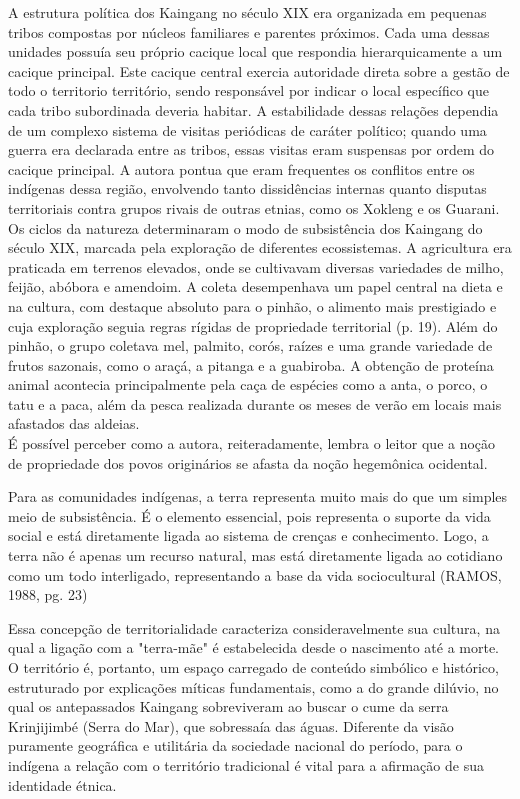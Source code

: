 \documentclass[12pt, a4paper]{article}
\newenvironment{citacao}{
  \vspace{0.5cm} %
  \small %
  \begin{list}{}{
    \leftmargin=4cm %
    \rightmargin=0cm
    \parsep=0pt
    \topsep=0pt
    \partopsep=0pt
  }
  \item\relax
  \linespread{1.0}\selectfont %
}{
  \end{list}
  \vspace{0.5cm} %
}
\begin{document}
A estrutura política dos Kaingang no século XIX era organizada em pequenas tribos compostas por núcleos familiares e parentes próximos. Cada uma dessas unidades possuía seu próprio cacique local que respondia hierarquicamente a um cacique principal. Este cacique central exercia autoridade direta sobre a gestão de todo o territorio território, sendo responsável por indicar o local específico que cada tribo subordinada deveria habitar. A estabilidade dessas relações dependia de um complexo sistema de visitas periódicas de caráter político; quando uma guerra era declarada entre as tribos, essas visitas eram suspensas por ordem do cacique principal. A autora pontua que eram frequentes os conflitos entre os indígenas dessa região, envolvendo tanto dissidências internas quanto disputas territoriais contra grupos rivais de outras etnias, como os Xokleng e os Guarani.
\\

Os ciclos da natureza determinaram o modo de subsistência dos Kaingang do século XIX, marcada pela exploração de diferentes ecossistemas. A agricultura era praticada em terrenos elevados, onde se cultivavam diversas variedades de milho, feijão, abóbora e amendoim. A coleta desempenhava um papel central na dieta e na cultura, com destaque absoluto para o pinhão, o alimento mais prestigiado e cuja exploração seguia regras rígidas de propriedade territorial (p. 19). Além do pinhão, o grupo coletava mel, palmito, corós, raízes e uma grande variedade de frutos sazonais, como o araçá, a pitanga e a guabiroba. A obtenção de proteína animal acontecia principalmente pela caça de espécies como a anta, o porco, o tatu e a paca, além da pesca realizada durante os meses de verão em locais mais afastados das aldeias.
\\

É possível perceber como a autora, reiteradamente, lembra o leitor que a noção de propriedade dos povos originários se afasta da noção hegemônica ocidental.
\begin{citacao}
	Para as comunidades indígenas, a terra representa muito mais do que um  simples meio de subsistência. É o elemento essencial, pois representa o suporte da  vida social e está diretamente ligada ao sistema de crenças e conhecimento. Logo, a  terra não é apenas um recurso natural, mas está diretamente ligada ao cotidiano  como um todo interligado, representando a base da vida sociocultural (RAMOS, 1988, pg. 23)
\end{citacao}
Essa concepção de territorialidade caracteriza consideravelmente sua cultura, na qual a ligação com a "terra-mãe" é estabelecida desde o nascimento até a morte. O território é, portanto, um espaço carregado de conteúdo simbólico e histórico, estruturado por explicações míticas fundamentais, como a do grande dilúvio, no qual os antepassados Kaingang sobreviveram ao buscar o cume da serra Krinjijimbé (Serra do Mar), que sobressaía das águas. Diferente da visão puramente geográfica e utilitária da sociedade nacional do período, para o indígena a relação com o território tradicional é vital para a afirmação de sua identidade étnica.
\\
\end{document}

